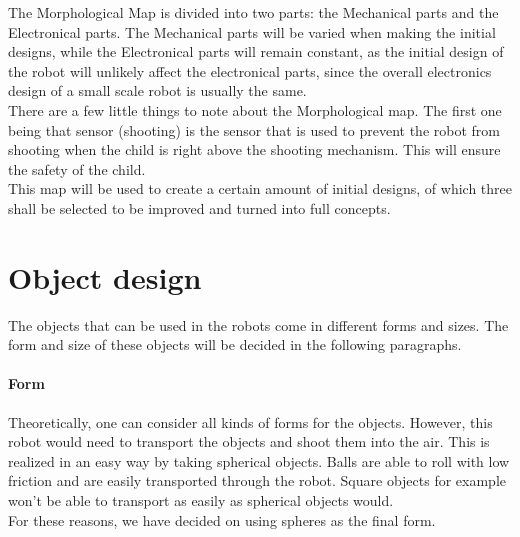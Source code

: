 \documentclass[11pt,twoside,a4paper]{report}
\begin{document}
The Morphological Map is divided into two parts: the Mechanical parts and the Electronical parts. The Mechanical parts will be varied when making the initial designs, while the Electronical parts will remain constant, as the initial design of the robot will unlikely affect the electronical parts, since the overall electronics design of a small scale robot is usually the same. \\
There are a few little things to note about the Morphological map. The first one being that sensor (shooting) is the sensor that is used to prevent the robot from shooting when the child is right above the shooting mechanism. This will ensure the safety of the child. \\
This map will be used to create a certain amount of initial designs, of which three shall be selected to be improved and turned into full concepts.
\label{chap:morphological}

\chapter{Object design}
The objects that can be used in the robots come in different forms and sizes. The form and size of these objects will be decided in the following paragraphs. 

\subsubsection{Form}
Theoretically, one can consider all kinds of forms for the objects. However, this robot would need to transport the objects and shoot them into the air. This is realized in an easy way by taking spherical objects. Balls are able to roll with low friction and are easily transported through the robot. Square objects for example won\rq{}t be able to transport as easily as spherical objects would. \\
For these reasons, we have decided on using spheres as the final form.
\end{document}
